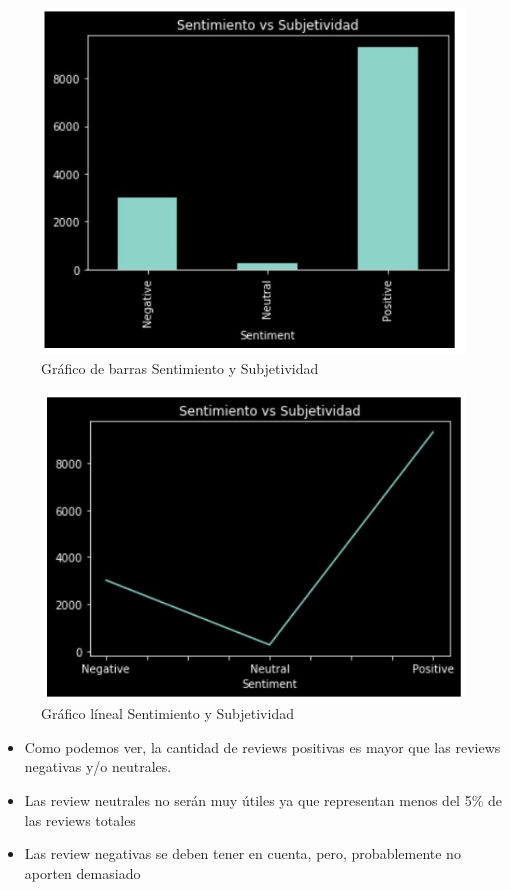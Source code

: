 \documentclass[conference]{IEEEtran}
\begin{document}
\begin{figure}[htb]
\centering
\includegraphics[scale=0.4]{Grafica2.jpg}
\caption{Gráfico de barras Sentimiento y Subjetividad}
\end{figure}
\begin{figure}[htb]
\centering
\includegraphics[scale=0.4]{Grafica3.jpg}
\caption{Gráfico líneal Sentimiento y Subjetividad}
\end{figure}

\begin{itemize}
\item Como podemos ver, la cantidad de reviews positivas es mayor que las reviews negativas y/o neutrales.
\item Las review neutrales no serán muy útiles ya que representan menos del 5\% de las reviews totales
\item Las review negativas se deben tener en cuenta, pero, probablemente no aporten demasiado
\end{itemize}
\end{document}
